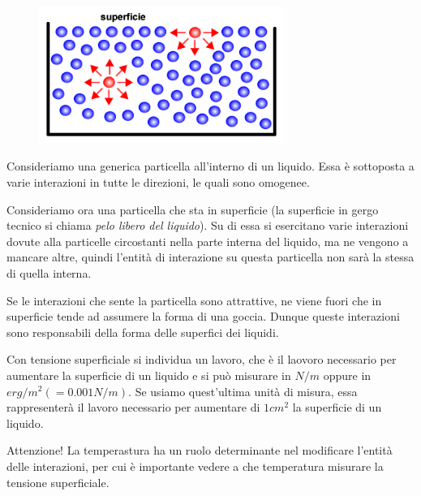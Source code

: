 \begin{figure}[htp]
    \centering
    \includegraphics[width=8cm]{immagini/tensione_superficiale.png}
\end{figure}

Consideriamo una generica particella all'interno di un liquido. Essa è sottoposta a varie interazioni in tutte le direzioni, le quali sono omogenee. 
    
Consideriamo ora una particella che sta in superficie (la superficie in gergo tecnico si chiama \textit{pelo libero del liquido}). Su di essa si esercitano varie interazioni dovute alla particelle circostanti nella parte interna del liquido, ma ne vengono a mancare altre, quindi l'entità di interazione su questa particella non sarà la stessa di quella interna.

Se le interazioni che sente la particella sono attrattive, ne viene fuori che in superficie tende ad assumere la forma di una goccia. Dunque queste interazioni sono responsabili della forma delle superfici dei liquidi.

Con tensione superficiale si individua un lavoro, che è il laovoro necessario per aumentare la superficie di un liquido e si può misurare in $N/m$ oppure in $erg/m^2(=0.001N/m)$. Se usiamo quest'ultima unità di misura, essa rappresenterà il lavoro necessario per aumentare di $1cm^2$  la superficie di un liquido.

Attenzione! La temperastura ha un ruolo determinante nel modificare l'entità delle interazioni, per cui è importante vedere a che temperatura misurare la tensione superficiale.

